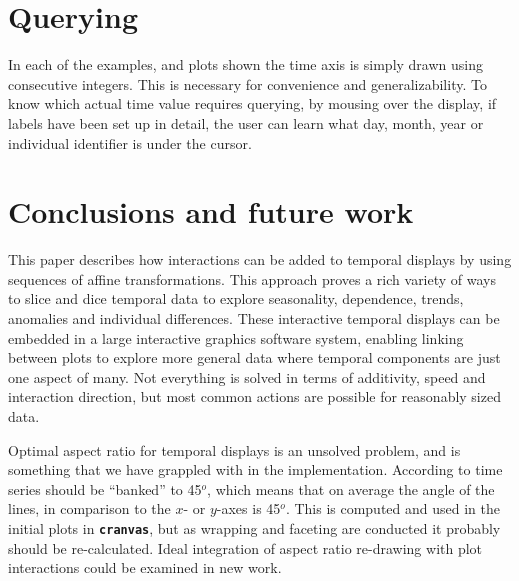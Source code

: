 \documentclass[12pt]{article}
\begin{document}
\section{Querying}

In each of the examples, and plots shown the time axis is
simply drawn using consecutive integers. This is necessary
for convenience and generalizability. To know which actual
time value requires querying, by mousing over the display,
if labels have been set up in detail, the user can learn what
day, month, year or individual identifier is under the cursor.

\section{Conclusions and future work}

This paper describes how interactions can be added to temporal displays by using sequences of affine transformations. This approach proves a rich variety of ways to slice and dice temporal data to explore seasonality, dependence, trends, anomalies and individual differences. These interactive temporal displays can be embedded in a large interactive graphics software system, enabling linking between plots to explore more general data where temporal components are just one aspect of many. Not everything is solved in terms of additivity, speed and interaction direction, but most common actions are possible for reasonably sized data.

Optimal aspect ratio for temporal displays is an unsolved problem,
and is something that we have grappled with in the implementation.
According to \citep{cleveland1993} time series should be ``banked''
to 45$^o$, which means that on average the angle of the lines, in
comparison to the $x$- or $y$-axes is 45$^o$. This is computed and
used in the initial plots in \texttt{\textbf{cranvas}}, but as
wrapping and faceting are conducted it probably should be
re-calculated. Ideal integration of aspect ratio re-drawing with
plot interactions could be examined in new work.

\end{document}
